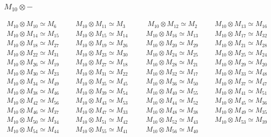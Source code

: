 \subsubsection{$M_10\otimes -$}
\begin{align*}
M_{10} \otimes M_{10} \simeq M_{6} &&& M_{10} \otimes M_{11} \simeq M_{3} &&& \
M_{10} \otimes M_{12} \simeq M_{2} &&& M_{10} \otimes M_{13} \simeq M_{16}\\
M_{10} \otimes M_{14} \simeq M_{15} &&& M_{10} \otimes M_{15} \simeq M_{14} &&\
& M_{10} \otimes M_{16} \simeq M_{13} &&& M_{10} \otimes M_{17} \simeq M_{32}\
\\
M_{10} \otimes M_{18} \simeq M_{27} &&& M_{10} \otimes M_{19} \simeq M_{26} &&\
& M_{10} \otimes M_{20} \simeq M_{29} &&& M_{10} \otimes M_{21} \simeq M_{28}\
\\
M_{10} \otimes M_{22} \simeq M_{31} &&& M_{10} \otimes M_{23} \simeq M_{30} &&\
& M_{10} \otimes M_{24} \simeq M_{25} &&& M_{10} \otimes M_{25} \simeq M_{24}\
\\
M_{10} \otimes M_{26} \simeq M_{19} &&& M_{10} \otimes M_{27} \simeq M_{18} &&\
& M_{10} \otimes M_{28} \simeq M_{21} &&& M_{10} \otimes M_{29} \simeq M_{20}\
\\
M_{10} \otimes M_{30} \simeq M_{23} &&& M_{10} \otimes M_{31} \simeq M_{22} &&\
& M_{10} \otimes M_{32} \simeq M_{17} &&& M_{10} \otimes M_{33} \simeq M_{48}\
\\
M_{10} \otimes M_{34} \simeq M_{49} &&& M_{10} \otimes M_{35} \simeq M_{45} &&\
& M_{10} \otimes M_{36} \simeq M_{50} &&& M_{10} \otimes M_{37} \simeq M_{47}\
\\
M_{10} \otimes M_{38} \simeq M_{46} &&& M_{10} \otimes M_{39} \simeq M_{54} &&\
& M_{10} \otimes M_{40} \simeq M_{55} &&& M_{10} \otimes M_{41} \simeq M_{51}\
\\
M_{10} \otimes M_{42} \simeq M_{56} &&& M_{10} \otimes M_{43} \simeq M_{53} &&\
& M_{10} \otimes M_{44} \simeq M_{52} &&& M_{10} \otimes M_{45} \simeq M_{36}\
\\
M_{10} \otimes M_{46} \simeq M_{37} &&& M_{10} \otimes M_{47} \simeq M_{33} &&\
& M_{10} \otimes M_{48} \simeq M_{38} &&& M_{10} \otimes M_{49} \simeq M_{35}\
\\
M_{10} \otimes M_{50} \simeq M_{34} &&& M_{10} \otimes M_{51} \simeq M_{42} &&\
& M_{10} \otimes M_{52} \simeq M_{43} &&& M_{10} \otimes M_{53} \simeq M_{39}\
\\
M_{10} \otimes M_{54} \simeq M_{44} &&& M_{10} \otimes M_{55} \simeq M_{41} &&\
& M_{10} \otimes M_{56} \simeq M_{40}\\
\end{align*}

